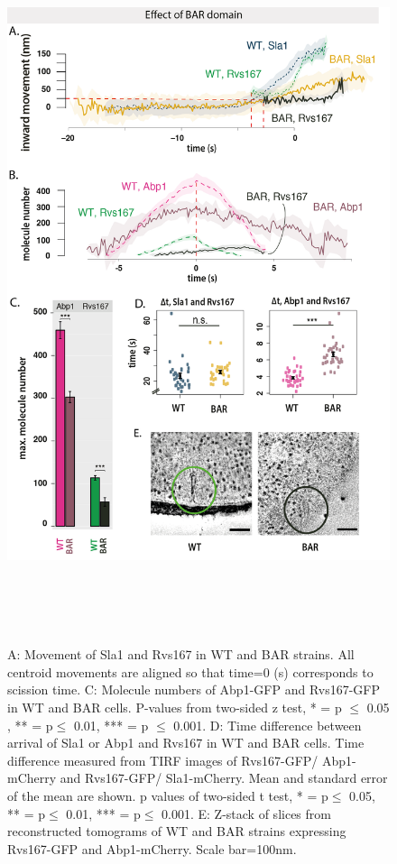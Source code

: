 \begin{figure}[H]
	\centering
	\includegraphics[width=21cm,height=21cm,keepaspectratio]{figures/results_final/delsh3_8}
	\caption [Tracking endocytic proteins in BAR cells]
	{A: Movement of Sla1 and Rvs167 in WT and BAR strains. All centroid movements are aligned so that time=0 (s) corresponds to scission time. 
	C: Molecule numbers of Abp1-GFP and Rvs167-GFP in WT and BAR cells. P-values from two-sided z test, * = p $\leq$ 0.05 , ** = p$\leq$ 0.01, *** = p $\leq$ 0.001. 
	D: Time difference between arrival of Sla1 or Abp1 and Rvs167  in WT and BAR cells. Time difference measured from TIRF images of  Rvs167-GFP/ Abp1-mCherry and Rvs167-GFP/ Sla1-mCherry. Mean and standard error of the mean are shown. p values of two-sided t test,  * = p$\leq$ 0.05, ** = p$\leq$ 0.01, *** = p$\leq$ 0.001. 
	E: Z-stack of slices from reconstructed tomograms of WT and BAR strains expressing Rvs167-GFP and Abp1-mCherry.  Scale bar=100nm.
	\label{fig2_sh3del}}

	\end{figure}
	\vspace{5mm}
	
